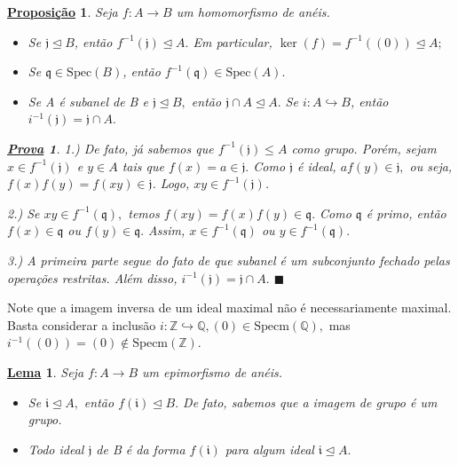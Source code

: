 \documentclass{article}
\newtheorem*{lemma*}{\underline{Lema}}
\newtheorem*{prop*}{\underline{Proposi\c c\~ao}}
\newtheorem*{proof*}{\underline{Prova}}
\renewcommand\qedsymbol{$\blacksquare$}
\begin{document}
\begin{prop*}
  Seja \(f:A\rightarrow B\) um homomorfismo de anéis.
  \begin{itemize}
    \item[1)] Se \(\mathfrak{j}\trianglelefteq{B}\), então \(f^{-1}(\mathfrak{j})\trianglelefteq{A}.\) Em particular, \(\ker{(f)} = f^{-1}((0))\trianglelefteq{A};\)
    \item[2)] Se \(\mathfrak{q}\in \mathrm{Spec}(B)\), então \(f^{-1}(\mathfrak{q})\in \mathrm{Spec}(A).\)
    \item[3)] Se A é subanel de B e \(\mathfrak{j}\trianglelefteq{B},\) então \(\mathfrak{j}\cap A \trianglelefteq{A}.\) Se \(i:A\hookrightarrow B\),
      então \(i^{-1}(\mathfrak{j})=\mathfrak{j}\cap A.\)
  \end{itemize}
  \begin{proof*}
    1.) De fato, já sabemos que \(f^{-1}(\mathfrak{j})\leq A\) como grupo. Porém, sejam \(x\in f^{-1}(\mathfrak{j})\)
    e \(y\in A\) tais que \(f(x) = a\in \mathfrak{j}.\) Como \(\mathfrak{j}\) é ideal, \(af(y)\in \mathfrak{j},\)
    ou seja, \(f(x)f(y) = f(xy)\in \mathfrak{j}\). Logo, \(xy\in f^{-1}(\mathfrak{j})\).

    2.) Se \(xy\in f^{-1}(\mathfrak{q}),\) temos \(f(xy) = f(x)f(y)\in \mathfrak{q}.\) Como \(\mathfrak{q}\) é primo, 
    então \(f(x)\in \mathfrak{q}\) ou \(f(y)\in \mathfrak{q}.\) Assim, \(x\in f^{-1}(\mathfrak{q})\) ou \(y\in f^{-1}(\mathfrak{q}).\)

    3.) A primeira parte segue do fato de que subanel é um subconjunto fechado pelas operações restritas. Além disso,
    \(i^{-1}(\mathfrak{j}) = \mathfrak{j}\cap A.\) \qedsymbol
  \end{proof*}
\end{prop*}
Note que a imagem inversa de um ideal maximal não é necessariamente maximal.
Basta considerar a inclusão \(i:\mathbb{Z}\hookrightarrow \mathbb{Q}, (0)\in \mathrm{Specm}(\mathbb{Q}),\)
mas \(i^{-1}((0)) = (0)\not\in \mathrm{Specm}(\mathbb{Z}).\)
\begin{lemma*}
  Seja \(f:A\rightarrow B\) um epimorfismo de anéis.
  \begin{itemize}
    \item[1)] Se \(\mathfrak{i}\trianglelefteq{A},\) então \(f(\mathfrak{i})\trianglelefteq{B}.\) De fato, sabemos que a imagem
      de grupo é um grupo.
    \item[2)] Todo ideal \(\mathfrak{j}\) de B é da forma \(f(\mathfrak{i})\) para algum ideal \(\mathfrak{i}\trianglelefteq{A}.\)
  \end{itemize}
\end{lemma*}
\end{document}
